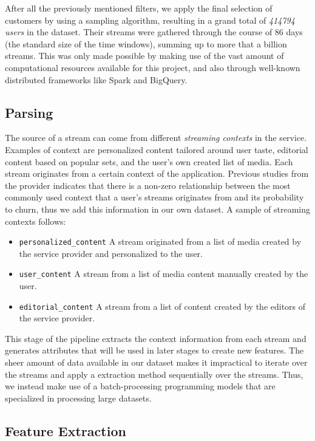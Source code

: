 \documentclass{kththesis}
\begin{document}
After all the previously mentioned filters, we apply the final selection of customers by using a sampling algorithm, resulting in a grand total of \emph{414794 users} in the dataset. Their streams were gathered through the course of 86 days (the standard size of the time windows), summing up to more that a billion streams. This was only made possible by making use of the vast amount of computational resources available for this project, and also through well-known distributed frameworks like Spark and BigQuery. 

\subsection{Parsing}

The source of a stream can come from different \emph{streaming contexts} in the service. Examples of context are personalized content tailored around user taste, editorial content based on popular sets, and the user's own created list of media. Each stream originates from a certain context of the application. Previous studies from the provider indicates that there is a non-zero relationship between the most commonly used context that a user's streams originates from and its probability to churn, thus we add this information in our own dataset. A sample of streaming contexts follows:

\begin{itemize}
  \item \verb|personalized_content| A stream originated from a list of media created by the service provider and personalized to the user.	
  \item \verb|user_content| A stream from a list of media content manually created by the user.
   \item \verb|editorial_content| A stream from a list of content created by the editors of the service provider.
\end{itemize}

This stage of the pipeline extracts the context information from each stream and generates attributes that will be used in later stages to create new features. The sheer amount of data available in our dataset makes it impractical to iterate over the streams and apply a extraction method sequentially over the streams. Thus, we instead make use of a batch-processing programming models that are specialized in processing large datasets. 

\subsection{Feature Extraction}
\end{document}

